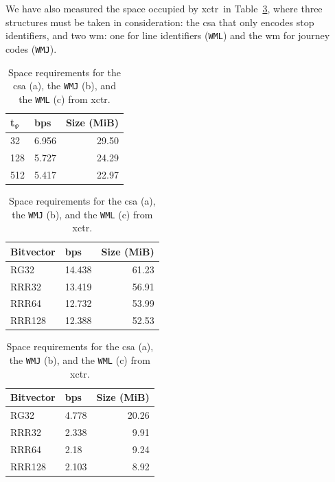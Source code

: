     We have also measured the space occupied by \gls{xctr}~in Table~\ref{tab:ctr}, where three structures must be taken in consideration: the \gls{csa} that only encodes stop identifiers, and two \gls{wm}: one for line identifiers (\texttt{WML}) and the \gls{wm} for journey codes (\texttt{WMJ}).
    
    \begin{table}[ht]
        \begin{subtable}[t]{.35\linewidth}
        \vspace{-12pt}
        \caption{}
        \begin{tabular}[t]{|l|l|r|}
            \hline
            t$_\Psi$ & bps & Size (MiB) \\
             \hline
            32 & 6.956 & 29.50 \\
            128 & 5.727 & 24.29 \\
            512 & 5.417 & 22.97 \\
            \hline
        \end{tabular}
        \end{subtable}
        \begin{subtable}[t]{.5\linewidth}
        \vspace{-12pt}
        \caption{}
        \begin{tabular}[t]{|l|l|r|}
            \hline
            Bitvector & bps & Size (MiB) \\
             \hline
            RG32 & 14.438 & 61.23 \\
            RRR32 & 13.419 & 56.91 \\
            RRR64 & 12.732 & 53.99 \\
            RRR128 & 12.388 & 52.53 \\
            \hline
        \end{tabular}
        \end{subtable}
        \begin{subtable}[t]{.4\linewidth}
        \vspace{-12pt}
        \caption{}
        \begin{tabular}[t]{|l|l|r|}
            \hline
            Bitvector & bps & Size (MiB) \\
             \hline
            RG32 & 4.778 & 20.26 \\
            RRR32 & 2.338 & 9.91 \\
            RRR64 & 2.18 & 9.24 \\
            RRR128 & 2.103 & 8.92 \\
            \hline
        \end{tabular}
        \end{subtable}%
        
        \caption{Space requirements for the \acrshort{csa} (a), the \texttt{WMJ} (b), and the \texttt{WML} (c) from \acrshort{xctr}.}
        \label{tab:ctr}
    \end{table}
    
